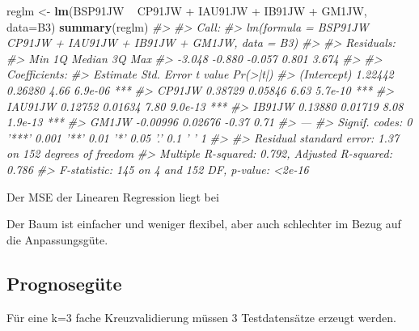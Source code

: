 \documentclass[12pt,]{book}
\newenvironment{Shaded}{\begin{snugshade}}{\end{snugshade}}
\newcommand{\KeywordTok}[1]{\textcolor[rgb]{0.13,0.29,0.53}{\textbf{{#1}}}}
\newcommand{\DataTypeTok}[1]{\textcolor[rgb]{0.13,0.29,0.53}{{#1}}}
\newcommand{\DecValTok}[1]{\textcolor[rgb]{0.00,0.00,0.81}{{#1}}}
\newcommand{\StringTok}[1]{\textcolor[rgb]{0.31,0.60,0.02}{{#1}}}
\newcommand{\CommentTok}[1]{\textcolor[rgb]{0.56,0.35,0.01}{\textit{{#1}}}}
\newcommand{\NormalTok}[1]{{#1}}
\begin{document}
\begin{Shaded}
\begin{Highlighting}[]
\NormalTok{reglm <-}\StringTok{ }\KeywordTok{lm}\NormalTok{(BSP91JW ~}\StringTok{ }\NormalTok{CP91JW +}\StringTok{ }\NormalTok{IAU91JW +}\StringTok{ }\NormalTok{IB91JW +}\StringTok{ }\NormalTok{GM1JW, }\DataTypeTok{data=}\NormalTok{B3)}
\KeywordTok{summary}\NormalTok{(reglm)}
\CommentTok{#> }
\CommentTok{#> Call:}
\CommentTok{#> lm(formula = BSP91JW ~ CP91JW + IAU91JW + IB91JW + GM1JW, data = B3)}
\CommentTok{#> }
\CommentTok{#> Residuals:}
\CommentTok{#>    Min     1Q Median     3Q    Max }
\CommentTok{#> -3.048 -0.880 -0.057  0.801  3.674 }
\CommentTok{#> }
\CommentTok{#> Coefficients:}
\CommentTok{#>             Estimate Std. Error t value Pr(>|t|)    }
\CommentTok{#> (Intercept)  1.22442    0.26280    4.66  6.9e-06 ***}
\CommentTok{#> CP91JW       0.38729    0.05846    6.63  5.7e-10 ***}
\CommentTok{#> IAU91JW      0.12752    0.01634    7.80  9.0e-13 ***}
\CommentTok{#> IB91JW       0.13880    0.01719    8.08  1.9e-13 ***}
\CommentTok{#> GM1JW       -0.00996    0.02676   -0.37     0.71    }
\CommentTok{#> ---}
\CommentTok{#> Signif. codes:  0 '***' 0.001 '**' 0.01 '*' 0.05 '.' 0.1 ' ' 1}
\CommentTok{#> }
\CommentTok{#> Residual standard error: 1.37 on 152 degrees of freedom}
\CommentTok{#> Multiple R-squared:  0.792,  Adjusted R-squared:  0.786 }
\CommentTok{#> F-statistic:  145 on 4 and 152 DF,  p-value: <2e-16}
\end{Highlighting}
\end{Shaded}

Der MSE der Linearen Regression liegt bei

\begin{Shaded}
\end{Shaded}

Der Baum ist einfacher und weniger flexibel, aber auch schlechter im
Bezug auf die Anpassungsgüte.

\subsection{Prognosegüte}\label{prognosegute}

Für eine k=3 fache Kreuzvalidierung müssen 3 Testdatensätze erzeugt
werden.
\end{document}
